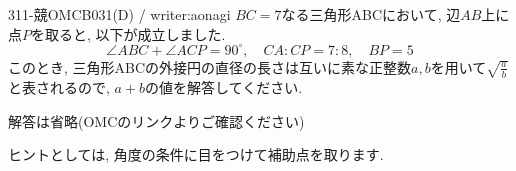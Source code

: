 \begin{prob}{311}{-競}{OMCB031(D) / writer:aonagi}
$BC=7$なる三角形ABCにおいて, 辺$AB$上に点$P$を取ると, 以下が成立しました. 
\[
\angle{ABC} + \angle{ACP} = 90^{\circ},\quad CA:CP = 7:8,\quad BP = 5
\]
このとき, 三角形ABCの外接円の直径の長さは互いに素な正整数$a,b$を用いて$\sqrt{\frac{a}{b}}$と表されるので, $a+b$の値を解答してください. 
\end{prob}

解答は省略(OMCのリンクよりご確認ください)

ヒントとしては, 角度の条件に目をつけて補助点を取ります. 
